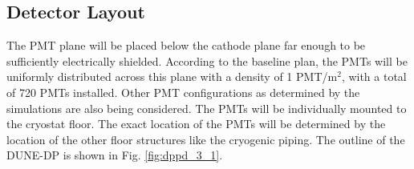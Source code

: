 

\subsection{Detector Layout}
\label{sec:fddp-pd-1.4}

The PMT plane will be placed below the cathode plane far enough to be sufficiently electrically shielded. According to the baseline plan, the PMTs will be uniformly distributed across this plane with a density of 1 PMT/m$^2$, with a total of 720 PMTs installed. Other PMT configurations as determined by the simulations are also being considered. The PMTs will be individually mounted to the cryostat floor. The exact location of the PMTs will be determined by the location of the other floor structures like the cryogenic piping. The outline of the DUNE-DP is shown in Fig. \ref{fig:dppd_3_1}.

